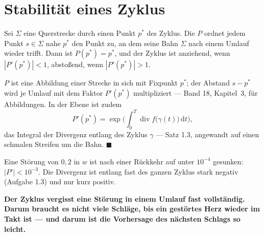 \section{Stabilität eines Zyklus}

\begin{merksatz}
Sei $\Sigma$ eine Querstrecke durch einen Punkt $p^{*}$ des Zyklus. Die  $P$ ordnet jedem Punkt $s\in\Sigma$ nahe $p^{*}$ den Punkt zu, an dem seine Bahn $\Sigma$ nach einem Umlauf wieder trifft. Dann ist $P(p^{*}) = p^{*}$, und der Zyklus ist anziehend, wenn $|P'(p^{*})| < 1$, abstoßend, wenn $|P'(p^{*})| > 1$.

$P$ ist eine Abbildung einer Strecke in sich mit Fixpunkt $p^{*}$; der Abstand $s - p^{*}$ wird je Umlauf mit dem Faktor $P'(p^{*})$ multipliziert --- Band 18, Kapitel~3, für Abbildungen. In der Ebene ist zudem
\[ P'(p^{*}) = \exp\Big(\int_0^{T}\operatorname{div} f\big(\gamma(t)\big)\,\mathrm dt\Big) , \]
das Integral der Divergenz entlang des Zyklus $\gamma$ --- Satz 1.3, angewandt auf einen schmalen Streifen um die Bahn. $\blacksquare$

Eine Störung von $0{,}2$ in $w$ ist nach einer Rückkehr auf unter $10^{-4}$ gesunken: $|P'| < 10^{-3}$. Die Divergenz ist entlang fast des ganzen Zyklus stark negativ (Aufgabe 1.3) und nur kurz positiv.

\begin{center}
\begin{minipage}{0.9\textwidth}
\textbf{Der Zyklus vergisst eine Störung in einem Umlauf fast vollständig. Darum braucht es nicht viele Schläge, bis ein gestörtes Herz wieder im Takt ist --- und darum ist die Vorhersage des nächsten Schlags so leicht.}
\end{minipage}
\end{center}

\begin{center}
\begin{minipage}{0.88\textwidth}
\end{minipage}
\end{center}
\end{merksatz}

